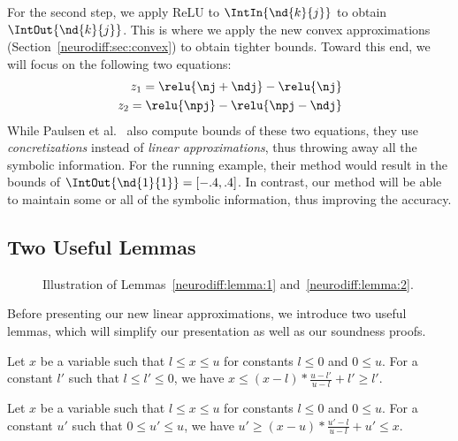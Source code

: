 For the second step, we apply ReLU to $ \IntIn{\nd{k}{j}} $ to obtain
$ \IntOut{\nd{k}{j}} $. This is where we apply the new convex
approximations (Section~\ref{neurodiff:sec:convex}) to obtain tighter bounds.
Toward this end, we will focus on the following two equations:
%
\begin{align}
z_1 = \relu{{\nj} + {\ndj}} - \relu{{\nj}} \label{neurodiff:eq:1}\\
z_2 = \relu{{\npj}} - \relu{{\npj} - {\ndj}} \label{neurodiff:eq:2}
\end{align}
%
While Paulsen et al.~\cite{PaulsenWW20} also compute bounds of these
two equations, they use \emph{concretizations} instead of \emph{linear
approximations}, thus throwing away all the symbolic information.  For
the running example, their method would result in the bounds of
$ \IntOut{\nd{1}{1}} = [-.4, .4] $. In contrast, our method will be
able to maintain some or all of the symbolic information, thus
improving the accuracy.




\subsection{Two Useful Lemmas}

\begin{figure}[t]
	\centering
	\scalebox{1.0}{}
	\caption{Illustration of Lemmas~\ref{neurodiff:lemma:1}
	and~\ref{neurodiff:lemma:2}.\label{neurodiff:fig:lemma_fig}}
\end{figure}

Before presenting our new linear approximations, we introduce two
useful lemmas, which will simplify our presentation as well as our
soundness proofs.

\begin{lemma}\label{neurodiff:lemma:1}
	Let $ x $ be a variable such that $ l \leq x \leq u $ for constants $ l \leq 0 $ and $ 0 \leq u $. For a constant $ l' $ such that $ l \leq l' \leq 0 $, we have $ x \leq (x - l) * \frac{u - l'}{u - l} + l' \geq l' $.
\end{lemma}
\begin{lemma}\label{neurodiff:lemma:2}
	Let $ x $ be a variable such that $ l \leq x \leq u $ for constants $ l \leq 0 $ and $ 0 \leq u $. For a constant $ u' $ such that $ 0 \leq u' \leq u $, we have $ u' \geq (x - u) * \frac{u' - l}{u - l} + u' \leq x $.
\end{lemma}

